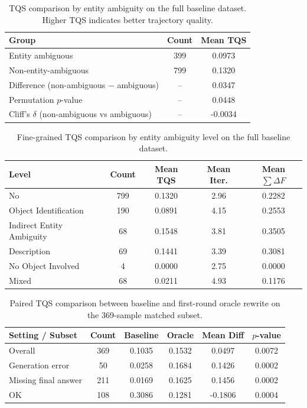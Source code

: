 
\begin{table}[t]
\centering
\small
\caption{TQS comparison by entity ambiguity on the full baseline dataset. Higher TQS indicates better trajectory quality.}
\label{tab:ambiguity-tqs-binary}
\begin{tabular}{lcc}
\toprule
Group & Count & Mean TQS \\
\midrule
Entity ambiguous & 399 & 0.0973 \\
Non-entity-ambiguous & 799 & 0.1320 \\
\midrule
Difference (non-ambiguous $-$ ambiguous) & -- & 0.0347 \\
Permutation $p$-value & -- & 0.0448 \\
Cliff's $\delta$ (non-ambiguous vs ambiguous) & -- & -0.0034 \\
\bottomrule
\end{tabular}
\end{table}

\begin{table}[t]
\centering
\small
\caption{Fine-grained TQS comparison by entity ambiguity level on the full baseline dataset.}
\label{tab:ambiguity-tqs-fine}
\begin{tabular}{lcccc}
\toprule
Level & Count & Mean TQS & Mean Iter. & Mean $\sum \Delta F$ \\
\midrule
No & 799 & 0.1320 & 2.96 & 0.2282 \\
Object Identification & 190 & 0.0891 & 4.15 & 0.2553 \\
Indirect Entity Ambiguity & 68 & 0.1548 & 3.81 & 0.3505 \\
Description & 69 & 0.1441 & 3.39 & 0.3081 \\
No Object Involved & 4 & 0.0000 & 2.75 & 0.0000 \\
Mixed & 68 & 0.0211 & 4.93 & 0.1176 \\
\bottomrule
\end{tabular}
\end{table}

\begin{table}[t]
\centering
\small
\caption{Paired TQS comparison between baseline and first-round oracle rewrite on the 369-sample matched subset.}
\label{tab:oracle-rewrite-tqs}
\begin{tabular}{lccccc}
\toprule
Setting / Subset & Count & Baseline & Oracle & Mean Diff & $p$-value \\
\midrule
Overall & 369 & 0.1035 & 0.1532 & 0.0497 & 0.0072 \\
Generation error & 50 & 0.0258 & 0.1684 & 0.1426 & 0.0002 \\
Missing final answer & 211 & 0.0169 & 0.1625 & 0.1456 & 0.0002 \\
OK & 108 & 0.3086 & 0.1281 & -0.1806 & 0.0004 \\
\bottomrule
\end{tabular}
\end{table}


